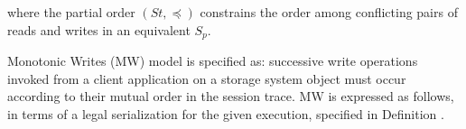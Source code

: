 \documentclass{sig-alternate-05-2015}
\begin{document}
\begin{align}
\begin{split}
\end{split}
  \end{align} where the partial order $\left( \mathit{St}, \preccurlyeq \right)$ constrains the order among conflicting pairs of reads and writes  in an equivalent $S_p$.
 \par Monotonic Writes (MW) model is specified as: successive write operations invoked from a client application on a storage system object must occur according to their mutual order in the session trace.  MW is expressed as follows, in
 terms of a legal serialization for the given execution, specified in Definition \label{def:parser}.
\end{document}
